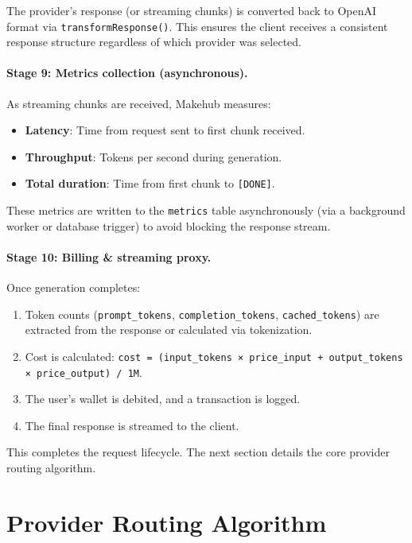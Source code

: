 \documentclass[english]{article}
\begin{document}
The provider's response (or streaming chunks) is converted back to OpenAI format via \texttt{transformResponse()}. This ensures the client receives a consistent response structure regardless of which provider was selected.

\paragraph{Stage 9: Metrics collection (asynchronous).}

As streaming chunks are received, Makehub measures:
\begin{itemize}
    \item \textbf{Latency}: Time from request sent to first chunk received.
    \item \textbf{Throughput}: Tokens per second during generation.
    \item \textbf{Total duration}: Time from first chunk to \texttt{[DONE]}.
\end{itemize}

These metrics are written to the \texttt{metrics} table asynchronously (via a background worker or database trigger) to avoid blocking the response stream.

\paragraph{Stage 10: Billing \& streaming proxy.}

Once generation completes:
\begin{enumerate}
    \item Token counts (\texttt{prompt\_tokens}, \texttt{completion\_tokens}, \texttt{cached\_tokens}) are extracted from the response or calculated via tokenization.
    \item Cost is calculated: \texttt{cost = (input\_tokens × price\_input + output\_tokens × price\_output) / 1M}.
    \item The user's wallet is debited, and a transaction is logged.
    \item The final response is streamed to the client.
\end{enumerate}

This completes the request lifecycle. The next section details the core provider routing algorithm.


\newpage
\section{Provider Routing Algorithm}
\end{document}
